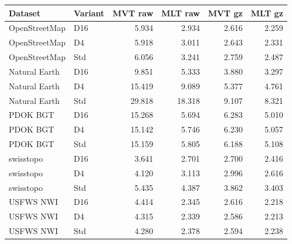 \begingroup\small\setlength{\tabcolsep}{3pt}
\begin{longtable}{llrrrr}
\toprule
Dataset & Variant & MVT raw & MLT raw & MVT gz & MLT gz \\
\midrule
OpenStreetMap & D16 & 5.934 & 2.934 & 2.616 & 2.259 \\
OpenStreetMap & D4 & 5.918 & 3.011 & 2.643 & 2.331 \\
OpenStreetMap & Std & 6.056 & 3.241 & 2.759 & 2.487 \\
Natural Earth & D16 & 9.851 & 5.333 & 3.880 & 3.297 \\
Natural Earth & D4 & 15.419 & 9.089 & 5.377 & 4.761 \\
Natural Earth & Std & 29.818 & 18.318 & 9.107 & 8.321 \\
PDOK BGT & D16 & 15.268 & 5.694 & 6.283 & 5.010 \\
PDOK BGT & D4 & 15.142 & 5.746 & 6.230 & 5.057 \\
PDOK BGT & Std & 15.159 & 5.805 & 6.188 & 5.108 \\
swisstopo & D16 & 3.641 & 2.701 & 2.700 & 2.416 \\
swisstopo & D4 & 4.120 & 3.113 & 2.996 & 2.616 \\
swisstopo & Std & 5.435 & 4.387 & 3.862 & 3.403 \\
USFWS NWI & D16 & 4.414 & 2.345 & 2.616 & 2.218 \\
USFWS NWI & D4 & 4.315 & 2.339 & 2.586 & 2.213 \\
USFWS NWI & Std & 4.280 & 2.378 & 2.594 & 2.238 \\
\bottomrule
\end{longtable}
\endgroup
